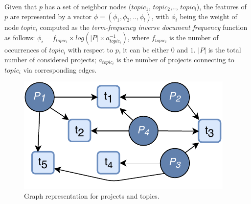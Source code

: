 Given that $p$ has a set of neighbor nodes ($topic_{1}$, $topic_{2}$,.., 
$topic_{l}$), the features of $p$ are represented by a vector 
$\phi=(\phi_{1},\phi_{2},..,\phi_{l})$, with $\phi_{i}$ being the weight of 
node $topic_{i}$ computed as the \emph{term-frequency inverse document 
frequency} function as follows: $\phi_{i} = f_{topic_{i}} \times log( \left | P 
\right | \times a_{topic_{i}}^{-1} )$, where $f_{topic_{i}}$ is the number of 
occurrences of $topic_{i}$ with respect to $p$, it can be either $0$ and $1$. 
$\left | P \right |$ is the total number of 
considered 
projects; $a_{topic_{i}}$ is the number of projects connecting to $topic_{i}$ 
via corresponding edges.
\begin{figure}[t!]
\centering
\includegraphics[width=0.8\columnwidth]{figs/graphCFtop.pdf}
\caption{Graph representation for projects and topics.}
\label{fig:Graph}
\end{figure}
